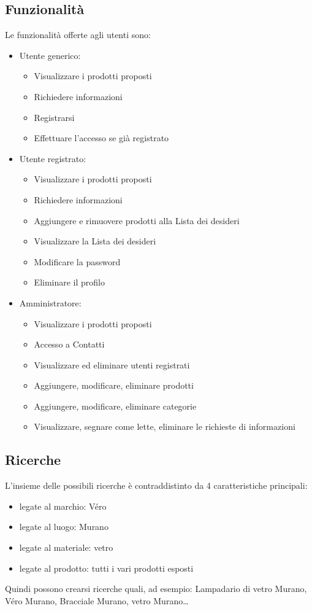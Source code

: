\documentclass[a4paper, 11pt]{article}
\begin{document}
\subsection{Funzionalità}
Le funzionalità offerte agli utenti sono:
\begin{itemize}
\item Utente generico:
	\begin{itemize}
	\item Visualizzare i prodotti proposti
	\item Richiedere informazioni
	\item Registrarsi
	\item Effettuare l'accesso se già registrato
	\end{itemize}
	
\item Utente registrato:
	\begin{itemize}
	\item Visualizzare i prodotti proposti
	\item Richiedere informazioni
	\item Aggiungere e rimuovere prodotti alla Lista dei desideri
	\item Visualizzare la Lista dei desideri
	\item Modificare la password
	\item Eliminare il profilo
	\end{itemize}

\pagebreak
\item Amministratore:
	\begin{itemize}
	\item Visualizzare i prodotti proposti
        \item Accesso a Contatti
	\item Visualizzare ed eliminare utenti registrati
	\item Aggiungere, modificare, eliminare prodotti
	\item Aggiungere, modificare, eliminare categorie
	\item Visualizzare, segnare come lette, eliminare le richieste di informazioni
	\end{itemize}
	
\end{itemize}


\subsection{Ricerche}
L’insieme delle possibili ricerche è contraddistinto da 4 caratteristiche principali:
\begin{itemize}
    \item legate al marchio: Véro
    \item legate al luogo: Murano
    \item legate al materiale: vetro
    \item legate al prodotto: tutti i vari prodotti esposti
\end{itemize}
Quindi possono crearsi ricerche quali, ad esempio: Lampadario di vetro Murano, Véro Murano, Bracciale Murano, vetro Murano… 
\end{document}
